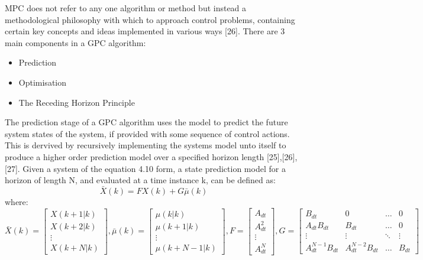 \documentclass[12pt,a4paper,twoside]{report}
\begin{document}
				MPC does not refer to any one algorithm or method but instead a methodological philosophy with which to approach control problems, containing certain key concepts and ideas implemented in various ways [26]. There are 3 main components in a GPC algorithm:
				\begin{itemize}
					\item 
						Prediction
					\item
						Optimisation
					\item
						The Receding Horizon Principle
				\end{itemize}
				\space
				The prediction stage of a GPC algorithm uses the model to predict the future system states of the system, if provided with some sequence of control actions. This is dervived by recursively implementing the systems model unto itself to produce a higher order prediction model over a specified horizon length [25],[26],[27]. Given a system of the equation 4.10 form, a state prediction model for a horizon of length N, and evaluated at a time instance k, can be defined as:
				\begin{equation}
					\bar{X}(k) = F X(k) + G \bar{\mu}(k)
				\end{equation}
				where:
				\begin{equation}
					\bar{X}(k) = 
					\begin{bmatrix}
						X(k+1|k)\\
						X(k+2|k)\\
						\vdots\\
						X(k+N|k)
					\end{bmatrix}
					,
					\bar{\mu}(k) = 
					\begin{bmatrix}
						\mu(k|k)\\
						\mu(k+1|k)\\
						\vdots\\
						\mu(k+N-1|k)
					\end{bmatrix}
					,
					F =
					\begin{bmatrix}
						A_{dt}\\
						A_{dt}^{2}\\
						\vdots\\
						A_{dt}^{N}
					\end{bmatrix}
					,
					G =
					\begin{bmatrix}
						B_{dt} & 0 & \dots & 0\\
						A_{dt}B_{dt}& B_{dt}& \dots & 0\\
						\vdots& \vdots & \ddots & \vdots\\ 
						A_{dt}^{N-1}B_{dt}& A_{dt}^{N-2}B_{dt} & \dots & B_{dt}
					\end{bmatrix}
				\end{equation}
\end{document}
